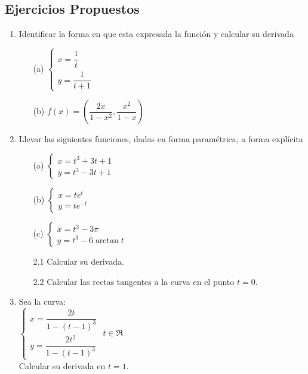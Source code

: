\documentclass[10pt,twoside]{SelfArx} %
\begin{document}
\subsection{Ejercicios Propuestos}
\begin{enumerate}
	\item 	Identificar la forma en que esta expresada la funci\'on y calcular su derivada
	\begin{enumerate}
		\item[(a)]	$ \begin{cases}
		x=\dfrac{1}{t}\\
		y=\dfrac{1}{t+1}
		\end{cases} $
		\item[(b)]	$ f(x)=\left (\dfrac{2x}{1-x^{2}},\dfrac{x^{2}}{1-x}\right  ) $

	\end{enumerate}


	\item 	Llevar las siguientes funciones, dadas en forma param\'etrica, a forma expl\'icita
	\begin{enumerate}
		\item[(a)]	$ \begin{cases}
			x=t^{3}+3t+1\\
			y=t^{3}-3t+1
		\end{cases} $
		\item[(b)]$ \begin{cases}
			x=te^{t}\\
			y=te^{-t}
			\end{cases} $
		\item[(c)]$ \begin{cases}
			x=t^{3}-3\pi\\
			y=t^{3}-6\arctan t
			\end{cases} $
	\end{enumerate}
	\begin{enumerate}
		\item[2.1]	Calcular su derivada.
		\item[2.2]	Calcular las rectas tangentes a la curva en el punto $ t=0 $.
	\end{enumerate}
	\item	Sea la curva:\\
	
	$ \begin{cases}
	x=\dfrac{2t}{1-(t-1)^{3}}\\
	y=\dfrac{2t^{2}}{1-(t-1)^{3}}
	\end{cases} $
	$ t\in\Re $\\
	Calcular su derivada en $ t=1 $.
	

\end{enumerate}
\end{document}
